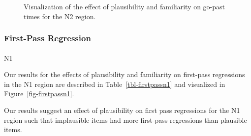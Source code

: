 \documentclass[
  12pt,
  letterpaper,
]{scrreprt}
\makeatletter
\let\oldparagraph\paragraph
\renewcommand{\paragraph}{
    \@ifstar
      \xxxParagraphStar
      \xxxParagraphNoStar
  }
\newcommand{\xxxParagraphStar}[1]{\oldparagraph*{#1}\mbox{}}
\newcommand{\xxxParagraphNoStar}[1]{\oldparagraph{#1}\mbox{}}
\makeatother
\begin{document}
\begin{figure}[htbp]

\caption{\label{fig-gopastn2staub}Visualization of the effect of
plausibility and familiarity on go-past times for the N2 region.}


\end{figure}%

\subsubsection{First-Pass Regression}\label{first-pass-regression}

\paragraph{N1}\label{n1-3}

Our results for the effects of plausibility and familiarity on
first-pass regressions in the N1 region are described in
Table~\ref{tbl-firstpassn1} and visualized in
Figure~\ref{fig-firstpassn1}.

Our results suggest an effect of plausibility on first pass regressions
for the N1 region such that implausible items had more first-pass
regressions than plausible items.
\end{document}
